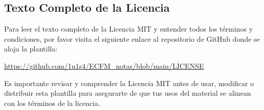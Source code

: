 \documentclass[11pt]{article}
\begin{document}
\subsection{Texto Completo de la Licencia}

Para leer el texto completo de la Licencia MIT y entender todos los términos y condiciones, por favor visita el siguiente enlace al repositorio de GitHub donde se aloja la plantilla:

\begin{center}
\url{https://github.com/1u1s4/ECFM_notas/blob/main/LICENSE}
\end{center}

Es importante revisar y comprender la Licencia MIT antes de usar, modificar o distribuir esta plantilla para asegurarte de que tus usos del material se alinean con los términos de la licencia.
\end{document}

